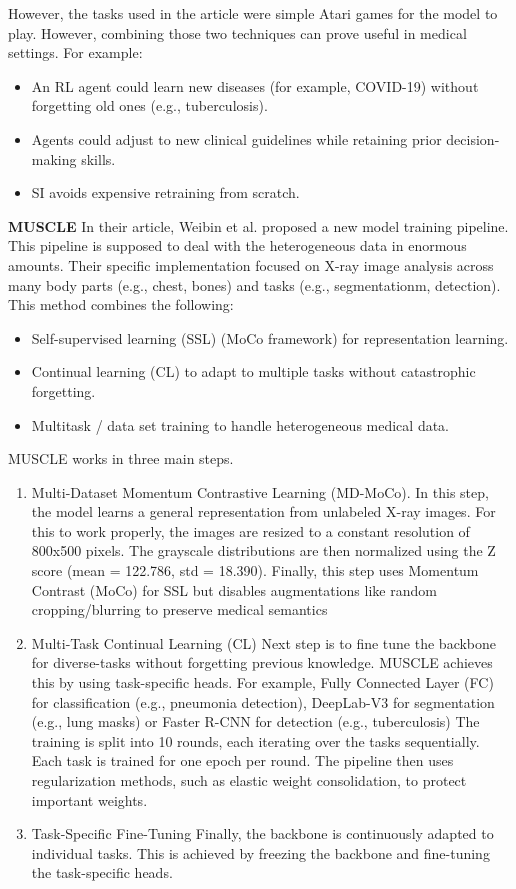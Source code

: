 \documentclass{IEEEcsmag}
\begin{document}
    However, the tasks used in the article were simple Atari games for the model to play.
    However, combining those two techniques can prove useful in medical settings. 
    For example:
    \begin{itemize}
        \item An RL agent could learn new diseases (for example, COVID-19) without forgetting old ones (e.g., tuberculosis).
        \item Agents could adjust to new clinical guidelines while retaining prior decision-making skills.
        \item SI avoids expensive retraining from scratch.
    \end{itemize}
    \textbf{MUSCLE}
    In their article, Weibin et al.\cite{cite-17} proposed a new model training pipeline.
    This pipeline is supposed to deal with the heterogeneous data in enormous amounts.
    Their specific implementation focused on X-ray image analysis across many body parts (e.g., chest, bones) and tasks (e.g., segmentationm, detection).
    This method combines the following:
    \begin{itemize}
        \item Self-supervised learning (SSL) (MoCo framework) for representation learning.
        \item Continual learning (CL) to adapt to multiple tasks without catastrophic forgetting.
        \item Multitask / data set training to handle heterogeneous medical data. 
    \end{itemize}
    MUSCLE works in three main steps.
    \begin{enumerate}
        \item Multi-Dataset Momentum Contrastive Learning (MD-MoCo).
        In this step, the model learns a general representation from unlabeled X-ray images.
        For this to work properly, the images are resized to a constant resolution of 800x500 pixels.
        The grayscale distributions are then normalized using the Z score (mean = 122.786, std = 18.390).
        Finally, this step uses Momentum Contrast (MoCo) for SSL but disables augmentations like random cropping/blurring to preserve medical semantics
        \item Multi-Task Continual Learning (CL)
        Next step is to fine tune the backbone for diverse-tasks without forgetting previous knowledge.
        MUSCLE achieves this by using task-specific heads. 
        For example, Fully Connected Layer (FC) for classification (e.g., pneumonia detection), DeepLab-V3 for segmentation (e.g., lung masks) or Faster R-CNN for detection (e.g., tuberculosis)
        The training is split into 10 rounds, each iterating over the tasks sequentially. 
        Each task is trained for one epoch per round.
        The pipeline then uses regularization methods, such as elastic weight consolidation, to protect important weights.
        \item Task-Specific Fine-Tuning 
        Finally, the backbone is continuously adapted to individual tasks.
        This is achieved by freezing the backbone and fine-tuning the task-specific heads.
        \end{enumerate} 
\end{document}
